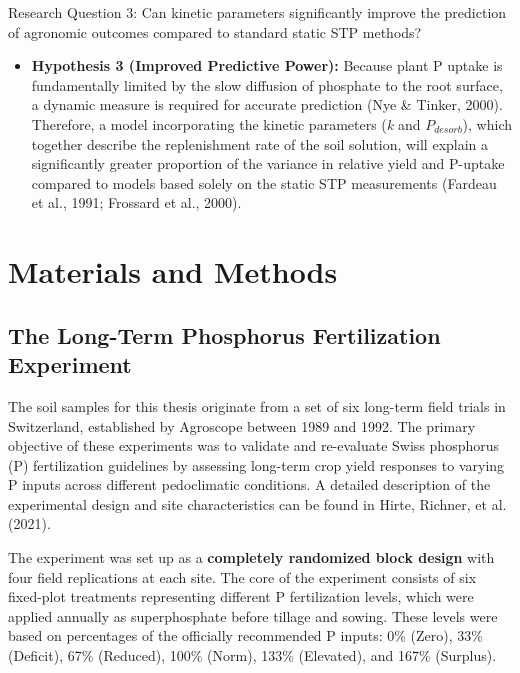 \documentclass[
  a4paper,
]{article}
\providecommand{\tightlist}{%
  \setlength{\itemsep}{0pt}\setlength{\parskip}{0pt}}
\begin{document}
Research Question 3: Can kinetic parameters significantly improve the
prediction of agronomic outcomes compared to standard static STP
methods?

\begin{itemize}
\tightlist
\item
  \textbf{Hypothesis 3 (Improved Predictive Power):} Because plant P
  uptake is fundamentally limited by the slow diffusion of phosphate to
  the root surface, a dynamic measure is required for accurate
  prediction (Nye \& Tinker, 2000). Therefore, a model incorporating the
  kinetic parameters (\emph{k} and \(P_{desorb}\)), which together
  describe the replenishment rate of the soil solution, will explain a
  significantly greater proportion of the variance in relative yield and
  P-uptake compared to models based solely on the static STP
  measurements (Fardeau et al., 1991; Frossard et al., 2000).
\end{itemize}

\newpage

\section{Materials and Methods}\label{sec-materials-and-methods}

\subsection{The Long-Term Phosphorus Fertilization
Experiment}\label{sec-the-long-term-phosphorus-fertilization-experiment}

The soil samples for this thesis originate from a set of six long-term
field trials in Switzerland, established by Agroscope between 1989 and
1992. The primary objective of these experiments was to validate and
re-evaluate Swiss phosphorus (P) fertilization guidelines by assessing
long-term crop yield responses to varying P inputs across different
pedoclimatic conditions. A detailed description of the experimental
design and site characteristics can be found in Hirte, Richner, et al.
(2021).

The experiment was set up as a \textbf{completely randomized block
design} with four field replications at each site. The core of the
experiment consists of six fixed-plot treatments representing different
P fertilization levels, which were applied annually as superphosphate
before tillage and sowing. These levels were based on percentages of the
officially recommended P inputs: 0\% (Zero), 33\% (Deficit), 67\%
(Reduced), 100\% (Norm), 133\% (Elevated), and 167\% (Surplus).
\end{document}
